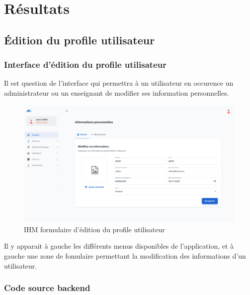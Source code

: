 \section{Résultats}

\subsection{Édition du profile utilisateur}

\subsubsection{Interface d'édition du profile utilisateur}

Il est question de l'interface qui permettra à un utilisateur en occurence un administrateur ou un enseignant de modifier ses information personnelles.

\begin{figure}[H]
	\centering
	\includegraphics[width=1\textwidth]{img/editpr}
	\caption{IHM formulaire d'édition du profile utilisateur}
	\label{fig:mesh1}
\end{figure}

Il y apparait à gauche les différents menus disponibles de l'application, et à gauche une zone de fomulaire permettant la modification des informations d'un utilisateur.

\subsubsection{Code source backend}

